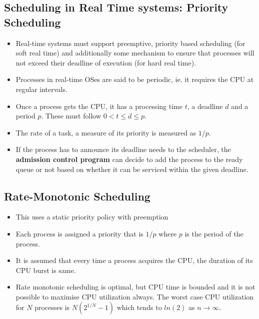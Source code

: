 \documentclass{article}
\theoremstyle{plain}
\theoremstyle{definition}
\begin{document}
\subsection{Scheduling in Real Time systems: Priority Scheduling}
\begin{itemize}
    \item Real-time systems must support preemptive, priority based scheduling (for soft real time) and additionally some mechanism to ensure that processes will not exceed their deadline of execution (for hard real time). 
    
    \item Processes in real-time OSes are said to be periodic, ie. it requires the CPU at regular intervals. 
    
    \item Once a process gets the CPU, it has a processing time $t$, a deadline $d$ and a period $p$. These must follow $ 0 < t \leq d \leq p$.
    
    \item The rate of a task, a measure of its priority is measured as $1/p$.
    
    \item If the process has to announce its deadline needs to the scheduler, the \textbf{admission control program} can decide to add the process to the ready queue or not based on whether it can be serviced within the given deadline. 
    
\end{itemize}

\subsection{Rate-Monotonic Scheduling}
\begin{itemize}

    \item This uses a static priority policy with preemption
    
    \item Each process is assigned a priority that is $1/p$ where $p$ is the period of the process.
    
    \item It is assumed that every time a process acquires the CPU, the duration of its CPU burst is same. 
    
    \item Rate monotonic scheduling is optimal, but CPU time is bounded and it is not possible to maximise CPU utilization always. The worst case CPU utilization for $N$ processes is $N (2^{1/N} - 1)$ which tends to $ln(2)$ as $n \longrightarrow \infty$.
\end{itemize}
\end{document}
